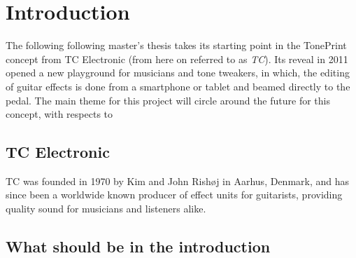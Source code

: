\chapter{Introduction}
\label{Introduction}
The following following master's thesis takes its starting point in the TonePrint concept from TC Electronic (from here on referred to as \textit{TC}). Its reveal in 2011 opened a new playground for musicians and tone tweakers, in which, the editing of guitar effects is done from a smartphone or tablet and beamed directly to the pedal. The main theme for this project will circle around the future for this concept, with respects to  

\section{TC Electronic}
\label{TCelectronic}
TC was founded in 1970 by Kim and John Rishøj in Aarhus, Denmark, and has since been a worldwide known producer of effect units for guitarists, providing quality sound for musicians and listeners alike. 

\section{What should be in the introduction}
\label{WhatShouldBeInTheIntroduction}

